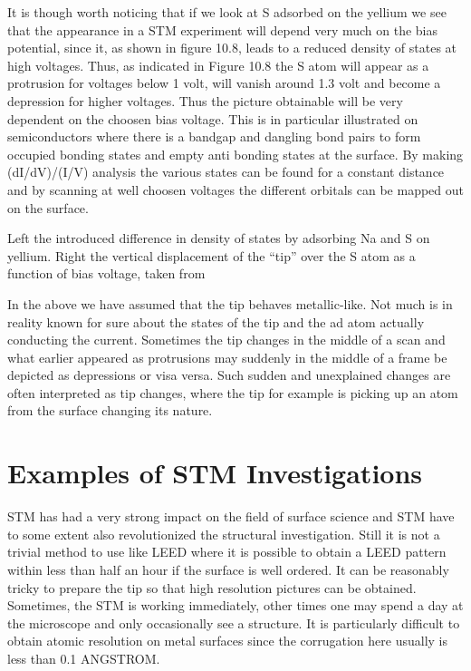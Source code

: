 It is though worth noticing that if we look at S adsorbed on the yellium we see that the appearance in a STM experiment will depend very much on the bias potential, since it, as shown in figure 10.8, leads to a reduced density of states at high voltages. Thus, as indicated in Figure 10.8 the S atom will appear as a protrusion for voltages below 1 volt, will vanish around 1.3 volt and become a depression for higher voltages. Thus the picture obtainable will be very dependent on the choosen bias voltage. This is in particular illustrated on semiconductors where there is a bandgap and dangling bond pairs to form occupied bonding states and empty anti bonding states at the surface. By making (dI/dV)/(I/V) analysis the various states can be found for a constant distance and by scanning  at well choosen voltages the different orbitals can be mapped out on the surface. 

\vspace*{11cm}

 Left the introduced difference in density of states by adsorbing Na and S on yellium. Right the vertical displacement of the ``tip'' over the S atom as a function of bias voltage, taken from \cite{Lang}

\vspace{1cm}  

In the above we have assumed that the tip behaves metallic-like. Not much is in reality known for sure about the states of the tip and the ad atom actually conducting the current. Sometimes the tip changes in the middle of a scan and what earlier appeared as protrusions may suddenly in the middle of a frame be  depicted as depressions or visa versa. Such sudden and unexplained changes are often interpreted as tip changes, where the tip for example is picking up  an atom  from the surface changing its nature.


\section{Examples of STM Investigations}
STM has had a very strong impact on the field of surface science and STM have to some extent also revolutionized the structural investigation. Still it is not a trivial method to use like LEED where it is possible to obtain a LEED pattern within less than half an hour if the surface is well ordered.  It can be reasonably tricky to prepare the tip so that high resolution pictures can be  obtained. Sometimes, the STM  is working immediately, other times one may spend a day at the microscope and only occasionally see a structure. It is particularly difficult to obtain atomic resolution on metal surfaces since the corrugation here usually is less than 0.1 ANGSTROM.

